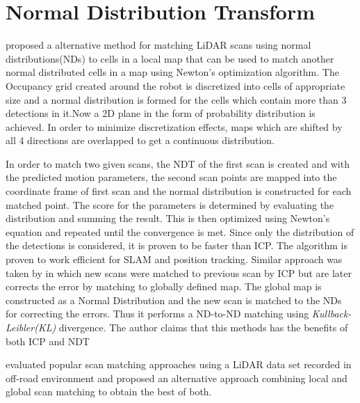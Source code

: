 \section{Normal Distribution Transform}
\cite{P.Biber} proposed a alternative method for matching LiDAR scans using normal distributions(NDs) to cells in a local map that can be used to match another normal distributed cells in a map using Newton's optimization algorithm. The Occupancy grid created around the robot is discretized into cells of appropriate size and a normal distribution is formed for the cells which contain more than 3 detections in it.Now a 2D plane in the form of probability distribution is achieved. In order to minimize discretization effects, maps which are shifted by all 4 directions are overlapped to get a continuous distribution.
\par
    In order to match two given scans, the NDT of the first scan is created and with the predicted motion parameters, the second scan points are mapped into the coordinate frame of first 
scan and the normal distribution is constructed for each matched point. The score for the parameters is determined by evaluating the distribution and summing the result. This is then optimized using Newton's equation and repeated until the convergence is met. Since only the distribution of the detections is considered, it is proven to be faster than ICP. The algorithm is proven to work efficient for SLAM and position tracking. Similar approach was taken by \cite{K.Ryu} in which new scans were matched to previous scan by ICP but are later corrects the error by matching to globally defined map. The global map is constructed as a Normal Distribution and the new scan is matched to the NDs for correcting the errors. Thus it performs a ND-to-ND matching using \textit{Kullback-Leibler(KL)} divergence. The author claims that this methods has the benefits of both ICP and NDT
\par
\cite{HaoFU} evaluated popular scan matching approaches using a LiDAR data set recorded in off-road environment and proposed an alternative approach combining local and global  scan matching to obtain the best of both.


